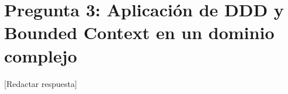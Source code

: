 \section{Pregunta 3: Aplicación de DDD y Bounded Context en un dominio complejo}


[Redactar respuesta]
